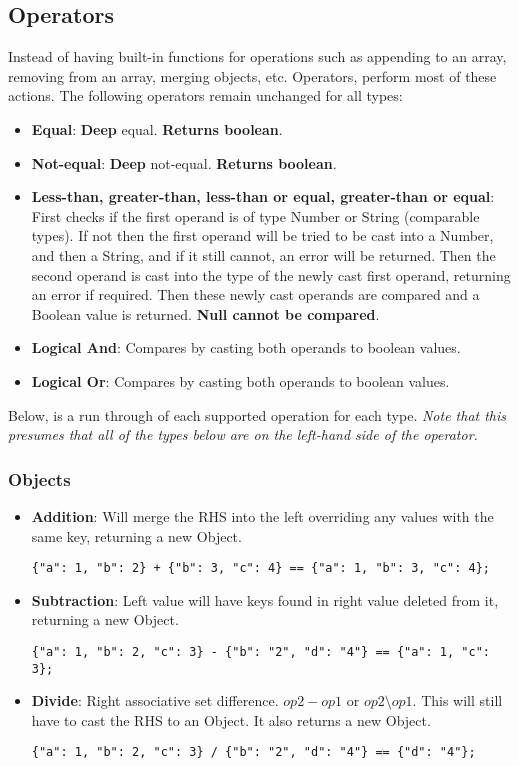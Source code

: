 \subsection{Operators}

Instead of having built-in functions for operations such as appending to an array, removing from an array, merging objects, etc. Operators, perform most of these actions. The following operators remain unchanged for all types:

\begin{itemize}
    \item \textbf{Equal}: \textbf{Deep} equal. \textbf{Returns boolean}.
    \item \textbf{Not-equal}: \textbf{Deep} not-equal. \textbf{Returns boolean}.
    \item \textbf{Less-than, greater-than, less-than or equal, greater-than or equal}: First checks if the first operand is of type Number or String (comparable types). If not then the first operand will be tried to be cast into a Number, and then a String, and if it still cannot, an error will be returned. Then the second operand is cast into the type of the newly cast first operand, returning an error if required. Then these newly cast operands are compared and a Boolean value is returned. \textbf{Null cannot be compared}.
    \item \textbf{Logical And}: Compares by casting both operands to boolean values.
    \item \textbf{Logical Or}: Compares by casting both operands to boolean values.
\end{itemize}

Below, is a run through of each supported operation for each type. \textit{Note that this presumes that all of the types below are on the left-hand side of the operator.}

\subsubsection{Objects}

\begin{itemize}
    \item \textbf{Addition}: Will merge the RHS into the left overriding any values with the same key, returning a new Object.
    \begin{verbatim}
{"a": 1, "b": 2} + {"b": 3, "c": 4} == {"a": 1, "b": 3, "c": 4};
    \end{verbatim}
    \item \textbf{Subtraction}: Left value will have keys found in right value deleted from it, returning a new Object.
    \begin{verbatim}
{"a": 1, "b": 2, "c": 3} - {"b": "2", "d": "4"} == {"a": 1, "c": 3};
    \end{verbatim}
    \item \textbf{Divide}: Right associative set difference. $op2 - op1$ or $op2 \setminus op1$. This will still have to cast the RHS to an Object. It also returns a new Object.
    \begin{verbatim}
{"a": 1, "b": 2, "c": 3} / {"b": "2", "d": "4"} == {"d": "4"};
    \end{verbatim}
\end{itemize}

